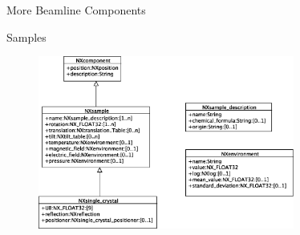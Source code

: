 \documentclass[final,nototal,pdf,mark]{prosper}
\begin{document}
\begin{slide}{More Beamline Components }
\begin{center}
\end{center}
\end{slide}\begin{slide}{Samples }
\begin{center}
\begin{figure}
\includegraphics[width=0.75\textwidth]{nxsample.eps}\end{figure}



\end{center}


\end{slide}
\end{document}
